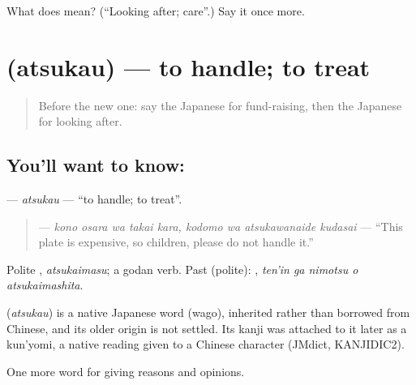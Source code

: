 \begin{tcolorbox}[breakable,colback=teal!4,colframe=teal!35!black,title={Before you move on}]
What does  mean? (\textquotedblleft{}Looking after; care\textquotedblright{}.) Say it once more.
\end{tcolorbox}
\section[\texorpdfstring{\ja{あつかう} (atsukau)}{あつかう (atsukau)}]{ (atsukau) — to handle; to treat}

\label{lesson:JA-C334-atsukau}



\begin{quote}
Before the new one: say the Japanese for fund-raising, then the Japanese for looking after.
\end{quote}

\subsection*{You'll want to know: }
\textbf{} — \emph{atsukau} — \textquotedblleft{}to handle; to treat\textquotedblright{}.

\begin{quote}
\textbf{    } — \emph{kono osara wa takai kara, kodomo wa atsukawanaide kudasai} — \textquotedblleft{}This plate is expensive, so children, please do not handle it.\textquotedblright{}
\end{quote}

Polite \textbf{}, \emph{atsukaimasu}; a godan verb. Past (polite): \textbf{  }, \emph{ten'in ga nimotsu o atsukaimashita}.

\begin{cousinweb}
\textbf{} (\emph{atsukau}) is a native Japanese word (wago), inherited rather than borrowed from Chinese, and its older origin is not settled. Its kanji was attached to it later as a kun'yomi, a native reading given to a Chinese character (JMdict, KANJIDIC2).
\end{cousinweb}

\begin{grammarlens}[title={What you've built}]
One more word for giving reasons and opinions.
\end{grammarlens}

